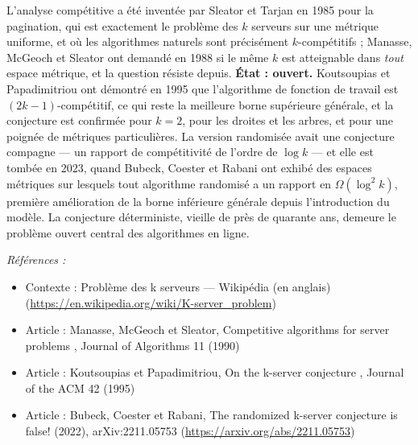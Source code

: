 \documentclass[11pt]{article}
\newenvironment{refs}{\par\small\noindent\emph{Références :}\begin{itemize}\setlength\itemsep{0pt}}{\end{itemize}\normalsize}
\begin{document}
\noindent L'analyse compétitive a été inventée par Sleator et Tarjan en 1985 pour la pagination, qui est exactement le problème des $k$ serveurs sur une métrique uniforme, et où les algorithmes naturels sont précisément $k$-compétitifs ; Manasse, McGeoch et Sleator ont demandé en 1988 si le même $k$ est atteignable dans \textit{tout} espace métrique, et la question résiste depuis. \textbf{État : ouvert.} Koutsoupias et Papadimitriou ont démontré en 1995 que l'algorithme de fonction de travail est $(2k-1)$-compétitif, ce qui reste la meilleure borne supérieure générale, et la conjecture est confirmée pour $k = 2$, pour les droites et les arbres, et pour une poignée de métriques particulières. La version randomisée avait une conjecture compagne --- un rapport de compétitivité de l'ordre de $\log k$ --- et elle est tombée en 2023, quand Bubeck, Coester et Rabani ont exhibé des espaces métriques sur lesquels tout algorithme randomisé a un rapport en $\Omega(\log^2 k)$, première amélioration de la borne inférieure générale depuis l'introduction du modèle. La conjecture déterministe, vieille de près de quarante ans, demeure le problème ouvert central des algorithmes en ligne.

\begin{refs}
\item Contexte : Problème des k serveurs --- Wikipédia (en anglais) (\url{https://en.wikipedia.org/wiki/K-server_problem})
\item Article : Manasse, McGeoch et Sleator, \og{} Competitive algorithms for server problems \fg{}, Journal of Algorithms 11 (1990)
\item Article : Koutsoupias et Papadimitriou, \og{} On the k-server conjecture \fg{}, Journal of the ACM 42 (1995)
\item Article : Bubeck, Coester et Rabani, \og{} The randomized k-server conjecture is false! \fg{} (2022), arXiv:2211.05753 (\url{https://arxiv.org/abs/2211.05753})
\end{refs}

\bigskip
\end{document}
